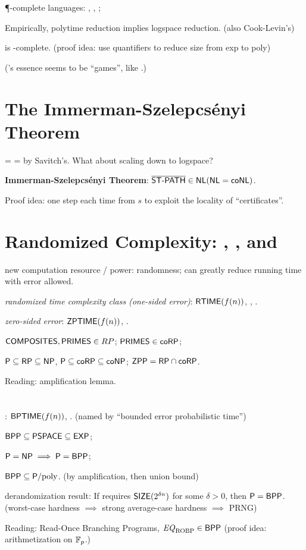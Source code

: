\documentclass{article}
\begin{document}
\P-complete languages: , , ;
\par
Empirically, polytime reduction implies logspace reduction. (also Cook-Levin's)
\par
{} is \PSPACE-complete. (proof idea: use quantifiers to reduce size from exp to poly)
\par
(\PSPACE's essence seems to be ``games'', like .)


\section{The Immerman-Szelepcsényi Theorem}

\NPSPACE = \coNPSPACE = \PSPACE by Savitch's. What about scaling down to logspace?
\par
\textbf{Immerman-Szelepcsényi Theorem}: $\overline{\text{\sf ST-PATH}} \in \text{\sf NL} (\text{\sf NL} = \text{\sf coNL})$.
\par
Proof idea: one step each time from $s$ to exploit the locality of ``certificates''.


\section{Randomized Complexity: \RP, \coRP, and \ZPP}

new computation resource / power: randomness; can greatly reduce running time with error allowed.
\par
\textit{randomized time complexity class (one-sided error)}: $\text{\sf RTIME}(f(n))$, \RP, \coRP.
\par
\textit{zero-sided error}: $\text{\sf ZPTIME}(f(n))$, \ZPP.
\par
$\text{\sf COMPOSITES}, \text{\sf PRIMES} \in RP$;
$\text{\sf PRIMES} \in \text{\sf coRP}$;
\par
$\text{\sf P} \subseteq \text{\sf RP} \subseteq \text{\sf NP}$, $\text{\sf P} \subseteq \text{\sf coRP} \subseteq \text{\sf coNP}$;
$\text{\sf ZPP} = \text{\sf RP} \cap \text{\sf coRP}$.
\par
Reading: amplification lemma.


\section{\BPP}

: $\text{\sf BPTIME}(f(n))$, \BPP. (named by ``bounded error probabilistic time'')
\par
$\text{\sf BPP} \subseteq \text{\sf PSPACE} \subseteq \text{\sf EXP}$;
\par
$\text{\sf P} = \text{\sf NP} \implies \text{\sf P} = \text{\sf BPP}$;
\par
$\BPP \subseteq \Ppoly$. (by amplification, then union bound)
\par
derandomization result: If  requires $\text{\sf SIZE}(2^{\delta n})$ for some $\delta > 0$, then $\text{\sf P} = \text{\sf BPP}$.
(worst-case hardness $\implies$ strong average-case hardness $\implies$ PRNG)
\par
Reading: Read-Once Branching Programs, ${\it EQ}_{\rm ROBP} \in \text{\sf BPP}$ (proof idea: arithmetization on $\mathbb F_p$.)
\end{document}
